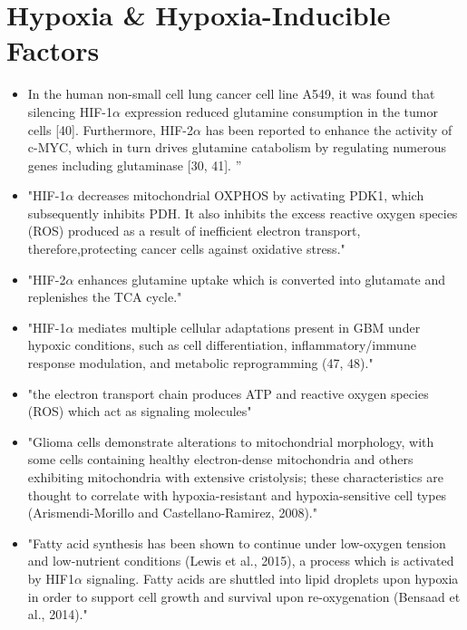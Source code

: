 \documentclass[11pt,a4paper]{article}
\begin{document}
\section{Hypoxia \& Hypoxia-Inducible Factors}
\begin{itemize}
\item In the human non-small cell lung cancer cell line A549, it was found that silencing HIF-1$\alpha$ expression reduced glutamine consumption in the tumor cells [40]. Furthermore, HIF-2$\alpha$ has been reported to enhance the activity of c-MYC, which in turn drives glutamine catabolism by regulating numerous genes including glutaminase [30, 41]. ”\cite{Ma2022}

\item "HIF-1$\alpha$ decreases mitochondrial OXPHOS by activating PDK1, which subsequently inhibits PDH. It also inhibits the excess reactive oxygen species (ROS) produced as a result of inefficient electron transport, therefore,protecting cancer cells against oxidative stress."\cite{Mudassar2020}

\item "HIF-2$\alpha$ enhances glutamine uptake which is converted into glutamate and replenishes the TCA cycle." \cite{Mudassar2020}

\item "HIF-1$\alpha$ mediates multiple cellular adaptations present in GBM under hypoxic conditions, such as cell differentiation, inflammatory/immune response modulation, and metabolic reprogramming (47, 48)." \cite{Chen2021}

\item "the electron transport chain produces ATP and reactive oxygen species (ROS) which act as signaling molecules"\cite{Strickland2017}

\item "Glioma cells demonstrate alterations to mitochondrial morphology, with some cells containing healthy electron-dense mitochondria and others exhibiting mitochondria with extensive cristolysis; these characteristics are thought to correlate with hypoxia-resistant and hypoxia-sensitive cell types (Arismendi-Morillo and Castellano-Ramirez, 2008)."

\item "Fatty acid synthesis has been shown to continue under low-oxygen tension and low-nutrient conditions (Lewis et al., 2015), a process which is activated by HIF1$\alpha$ signaling. Fatty acids are shuttled into lipid droplets upon hypoxia in order to support cell growth and survival upon re-oxygenation (Bensaad et al., 2014)."\cite{Strickland2017}


\end{itemize}
\end{document}
